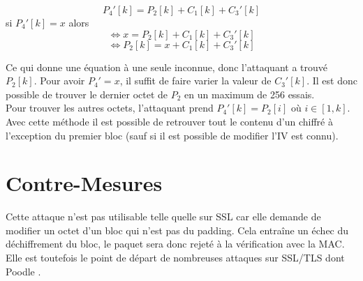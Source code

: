 \[P_4'[k] = P_2[k] + C_1[k] + C_3'[k]\] si $P_4'[k] = x$ alors
\[\Longleftrightarrow x = P_2[k] + C_1[k] + C_3'[k]\]
\[\Longleftrightarrow P_2[k] = x + C_1[k] + C_3'[k]\]

Ce qui donne une équation à une seule inconnue, donc l'attaquant a trouvé $P_2[k]$.
Pour avoir $P_4' = x$, il suffit de faire varier la valeur de $C_3'[k]$. Il est donc
possible de trouver le dernier octet de $P_2$ en un maximum de 256 essais.\\

Pour trouver les autres octets, l'attaquant prend $P_4'[k] = P_2[i]$ où $i \in [1,k]$.
Avec cette méthode il est possible de retrouver tout le contenu d'un chiffré à
l'exception du premier bloc (sauf si il est possible de modifier l'IV est connu).\\

\section{Contre-Mesures}
\label{sec:cmPOA}

Cette attaque n'est pas utilisable telle quelle sur SSL car elle demande de modifier un octet
d'un bloc qui n'est pas du padding. Cela entraîne un échec du déchiffrement du bloc, le
paquet sera donc rejeté à la vérification avec la MAC. Elle est toutefois le point de
départ de nombreuses attaques sur SSL/TLS dont Poodle\up{\ref{part:poodle}}
.
